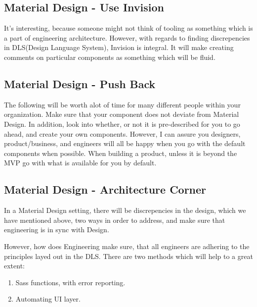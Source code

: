 \subsection{ Material Design - Use Invision }
It's interesting, because someone might not think of tooling as something which
is a part of engineering architecture. However, with regards to finding
discrepencies in DLS(Design Language System), Invision is integral. It will
make creating comments on particular components as something which will be fluid.

\subsection{ Material Design - Push Back }
The following will be worth alot of time for many different people within your
organization. Make sure that your component does not deviate from Material
Design. In addition, look into whether, or not it is pre-described for you to
go ahead, and create your own components. However, I can assure you designers,
product/business, and engineers will all be happy when you go with the default
components when possible. When building a product, unless it is beyond the MVP
go with what is available for you by default.

\subsection{ Material Design - Architecture Corner }
In a Material Design setting, there will be discrepencies in the design, which
we have mentioned above, two ways in order to address, and make sure that
engineering is in sync with Design.

However, how does Engineering make sure, that all engineers are adhering to the
principles layed out in the DLS. There are two methods which will help to a
great extent:
\begin{enumerate}
  \item Sass functions, with error reporting.
  \item Automating UI layer.
\end{enumerate}

